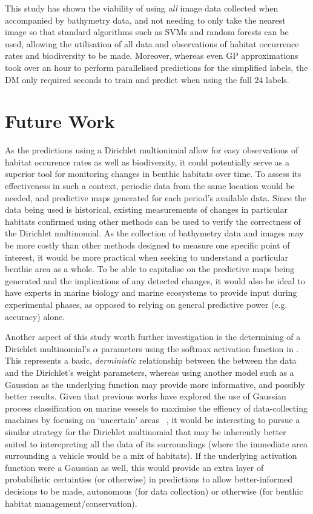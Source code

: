 This study has shown the viability of using \textit{all} image data collected when accompanied by bathymetry data, and not needing to only take the nearest image so that standard algorithms such as SVMs and random forests can be used, allowing the  utilisation of all data and observations of habitat occurrence rates and biodiversity to be made. Moreover, whereas even GP approximations took over an hour to perform parallelised predictions for the simplified labels, the DM only required seconds to train and predict when using the full $24$ labels.

\section{Future Work}

As the predictions using a Dirichlet multionimial allow for easy observations of habitat occurence rates as well as biodiversity, it could potentially serve as a superior tool for monitoring changes in benthic habitats over time. To assess its effectiveness in such a context, periodic data from the same location would be needed, and predictive maps generated for each period's available data. Since the data being used is historical, existing measurements of changes in particular habitats confirmed using other methods can be used to verify the correctness of the Dirichlet multinomial. As the collection of bathymetry data and images may be more costly than other methods designed to measure one specific point of interest, it would be more practical when seeking to understand a particular benthic area as a whole. To be able to capitalise on the predictive maps being generated and the implications of any detected changes, it would also be ideal to have experts in marine biology and marine ecosystems to provide input during experimental phases, as opposed to relying on general predictive power (e.g. accuracy) alone.

Another aspect of this study worth further investigation is the determining of a Dirichlet multinomial's $\alpha$ parameters using the softmax activation function in . This represents a basic, \textit{derministic} relationship between the between the data and the Dirichlet's weight parameters, whereas using another model such as a Gaussian as the underlying function may provide more informative, and possibly better results. Given that previous works have explored the use of Gaussian process classification on marine vessels to maximise the effiency of data-collecting machines by focusing on `uncertain' areas ~\citep{rigby10}, it would be interesting to pursue a similar strategy for the Dirichlet multinomial that may be inherently better suited to interepreting all the data of its surroundings (where the immediate area surrounding a vehicle would be a mix of habitats). If the underlying activation function were a Gaussian as well, this would provide an extra layer of probabilistic certainties (or otherwise) in predictions to allow better-informed decisions to be made, autonomous (for data collection) or otherwise (for benthic habitat management/conservation).
